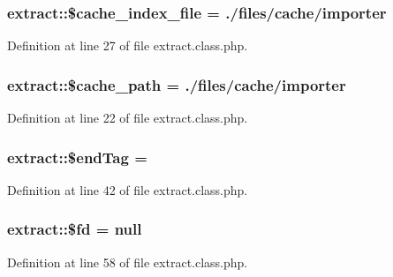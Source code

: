 \subsubsection[{\$cache\+\_\+index\+\_\+file}]{\setlength{\rightskip}{0pt plus 5cm}extract\+::\$cache\+\_\+index\+\_\+file = \textquotesingle{}./files/cache/{\bf importer}\textquotesingle{}}\label{classextract_a6bd40f89eeb4e608723a39f5824d0c1e}


Definition at line 27 of file extract.\+class.\+php.

\hypertarget{classextract_a00f1309c1e975d137a9f17ad9afc5d1e}{}
\subsubsection[{\$cache\+\_\+path}]{\setlength{\rightskip}{0pt plus 5cm}extract\+::\$cache\+\_\+path = \textquotesingle{}./files/cache/{\bf importer}\textquotesingle{}}\label{classextract_a00f1309c1e975d137a9f17ad9afc5d1e}


Definition at line 22 of file extract.\+class.\+php.

\hypertarget{classextract_a46190b1f23addca9726e18aa15929c2a}{}
\subsubsection[{\$end\+Tag}]{\setlength{\rightskip}{0pt plus 5cm}extract\+::\$end\+Tag = \textquotesingle{}\textquotesingle{}}\label{classextract_a46190b1f23addca9726e18aa15929c2a}


Definition at line 42 of file extract.\+class.\+php.

\hypertarget{classextract_ae21a224916b245a23dd69139f58c81ed}{}
\subsubsection[{\$fd}]{\setlength{\rightskip}{0pt plus 5cm}extract\+::\$fd = null}\label{classextract_ae21a224916b245a23dd69139f58c81ed}


Definition at line 58 of file extract.\+class.\+php.

\hypertarget{classextract_abec232df6889e57dd327ddf132799f4c}{}
